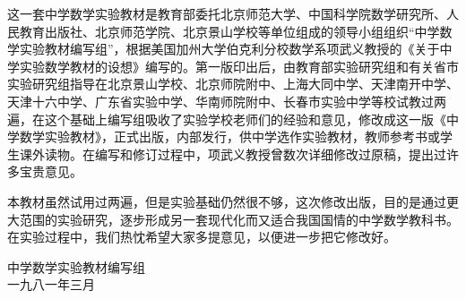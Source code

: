 这一套中学数学实验教材是教育部委托北京师范大学、中国科学院数学研究所、人民教育出版社、北京师范学院、北京景山学校等单位组成的领导小组组织“中学数学实验教材编写组”，根据美国加州大学伯克利分校数学系项武义教授的《关于中学实验数学教材的设想》编写的。第一版印出后，由教育部实验研究组和有关省市实验研究组指导在北京景山学校、北京师院附中、上海大同中学、天津南开中学、天津十六中学、广东省实验中学、华南师院附中、长春市实验中学等校试教过两遍，在这个基础上编写组吸收了实验学校老师们的经验和意见，修改成这一版《中学数学实验教材》，正式出版，内部发行，供中学选作实验教材，教师参考书或学生课外读物。在编写和修订过程中，项武义教授曾数次详细修改过原稿，提出过许多宝贵意见。

本教材虽然试用过两遍，但是实验基础仍然很不够，这次修改出版，目的是通过更大范围的实验研究，逐步形成另一套现代化而又适合我国国情的中学数学教科书。在实验过程中，我们热忱希望大家多提意见，以便进一步把它修改好。

\begin{flushright}
    中学数学实验教材编写组\\
    一九八一年三月
\end{flushright}








